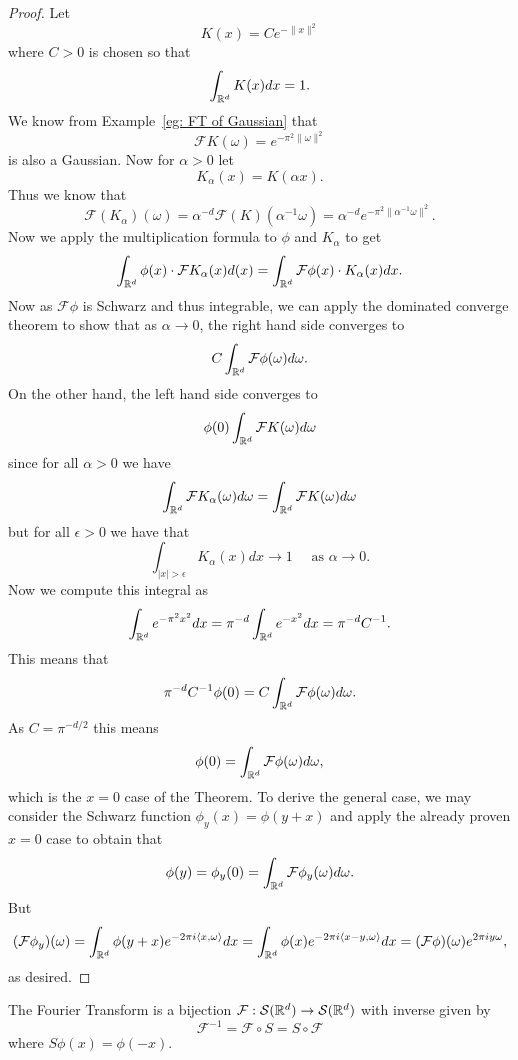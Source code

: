\documentclass[twoside, a4paper, 10pt]{amsart}
\begin{document}
\begin{proof} Let $$K(x) = C e^{-\|x\|^2}$$ where $C>0$ is chosen so that $$\int_{\mathbb{R}^d} K(x) dx = 1.$$ We know from Example~\ref{eg: FT of Gaussian} that $$\mathcal{F}K(\omega) = e^{-\pi^2 \|\omega\|^2}$$ is also a Gaussian. Now for $\alpha>0$ let $$K_{\alpha}(x) = K(\alpha x).$$ Thus we know that $$\mathcal{F}(K_{\alpha}) (\omega) = \alpha^{-d} \mathcal{F}(K) (\alpha^{-1} \omega) = \alpha^{-d} e^{-\pi^2 \|\alpha^{-1} \omega\|^2}.$$ Now we apply the multiplication formula to $\phi$ and $K_{\alpha}$ to get $$ \int_{\mathbb{R}^d} \phi(x) \cdot \mathcal{F} K_{\alpha}(x) d(x) = \int_{\mathbb{R}^d} \mathcal{F} \phi (x) \cdot K_{\alpha}(x) dx.$$ Now as $\mathcal{F}\phi$ is Schwarz and thus integrable, we can apply the dominated converge theorem to show that as $\alpha \to 0$, the right hand side converges to $$C\int_{\mathbb{R}^d} \mathcal{F}\phi(\omega) d\omega.$$ On the other hand, the left hand side converges to $$\phi(0) \int_{\mathbb{R}^d} \mathcal{F} K(\omega) d\omega $$ since for all $\alpha>0$ we have $$\int_{\mathbb{R}^d} \mathcal{F} K_{\alpha}(\omega) d\omega = \int_{\mathbb{R}^d} \mathcal{F} K(\omega) d\omega $$ but for all $\epsilon>0$ we have that $$\int_{|x|>\epsilon} K_{\alpha}(x) dx \to 1 \quad\text{ as } \alpha \to 0 .$$ Now we compute this integral as $$\int_{\mathbb{R}^d} e^{-\pi^2 x^2} dx = \pi^{-d} \int_{\mathbb{R}^d} e^{-x^2} dx = \pi^{-d}C^{-1}.$$ This means that $$\pi^{-d} C^{-1} \phi(0) = C \int_{\mathbb{R}^d} \mathcal{F}\phi(\omega) d\omega.$$ As $C = \pi^{-d/2}$ this means $$\phi(0) = \int_{\mathbb{R}^d} \mathcal{F}\phi(\omega) d\omega,$$ which is the $x = 0$ case of the Theorem. To derive the general case, we may consider the Schwarz function $\phi_y (x) = \phi(y+x)$ and apply the already proven $x = 0$ case to obtain that $$\phi(y) = \phi_y(0) = \int_{\mathbb{R}^d} \mathcal{F}\phi_y(\omega) d\omega.$$ But $$(\mathcal{F}\phi_y) (\omega) = \int_{\mathbb{R}^d} \phi(y+x) e^{-2\pi i \langle x , \omega \rangle} dx =  \int_{\mathbb{R}^d} \phi(x) e^{-2\pi i \langle x - y , \omega \rangle} dx = (\mathcal{F}\phi)(\omega) e^{2\pi i y\omega},$$ as desired.

\end{proof}

\begin{corol} The Fourier Transform is a bijection $\mathcal{F}:\mathcal{S}(\mathbb{R}^d) \to \mathcal{S}(\mathbb{R}^d)$ with inverse given by $$\mathcal{F}^{-1} = \mathcal{F} \circ S = S \circ \mathcal{F}$$ where $S\phi (x) = \phi(-x)$.

\end{corol}
\end{document}
